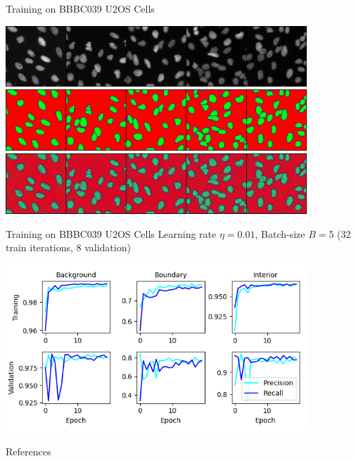 \documentclass[aspectratio=1610]{beamer}					%
\begin{document}
\begin{frame}{Training on BBBC039 U2OS Cells}

\begin{center}
\includegraphics[width=0.85\textwidth]{input-train.png}
\includegraphics[width=0.85\textwidth]{target-train.png}
\includegraphics[width=0.85\textwidth]{output-train.png}
\end{center}

\end{frame}

\begin{frame}{Training on BBBC039 U2OS Cells}
Learning rate $\eta=0.01$, Batch-size $B=5$ (32 train iterations, 8 validation)
\begin{center}
\includegraphics[width=0.85\textwidth]{metrics.png}
\end{center}

\end{frame}



\begin{frame}[allowframebreaks]{References}
	\tiny
	
\end{frame}
\end{document}
